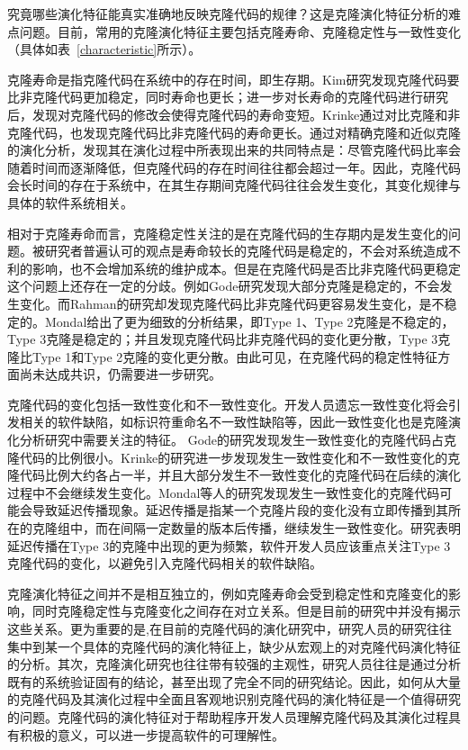 究竟哪些演化特征能真实准确地反映克隆代码的规律？这是克隆演化特征分析的难点问题。目前，常用的克隆演化特征主要包括克隆寿命、克隆稳定性与一致性变化（具体如表~\ref{characteristic}所示）。

克隆寿命是指克隆代码在系统中的存在时间，即生存期。Kim研究发现克隆代码要比非克隆代码更加稳定，同时寿命也更长\cite{kim2005empirical}；进一步对长寿命的克隆代码进行研究后，发现对克隆代码的修改会使得克隆代码的寿命变短\cite{cai2011empirical}。Krinke通过对比克隆和非克隆代码，也发现克隆代码比非克隆代码的寿命更长\cite{krinke2011cloned}。通过对精确克隆和近似克隆的演化分析，发现其在演化过程中所表现出来的共同特点是：尽管克隆代码比率会随着时间而逐渐降低，但克隆代码的存在时间往往都会超过一年\cite{bazrafshan2012evolution}。因此，克隆代码会长时间的存在于系统中，在其生存期间克隆代码往往会发生变化，其变化规律与具体的软件系统相关\cite{gode2009evolution}。

相对于克隆寿命而言，克隆稳定性关注的是在克隆代码的生存期内是发生变化的问题。被研究者普遍认可的观点是寿命较长的克隆代码是稳定的\cite{krinke2008cloned}\cite{gode2011clone}\cite{harder2013cloned}，不会对系统造成不利的影响，也不会增加系统的维护成本。但是在克隆代码是否比非克隆代码更稳定这个问题上还存在一定的分歧。例如Gode研究发现大部分克隆是稳定的，不会发生变化\cite{gode2011frequency}。而Rahman的研究却发现克隆代码比非克隆代码更容易发生变化，是不稳定的\cite{rahman2014change}。Mondal给出了更为细致的分析结果，即Type 1、Type 2克隆是不稳定的，Type 3克隆是稳定的；并且发现克隆代码比非克隆代码的变化更分散，Type 3克隆比Type 1和Type 2克隆的变化更分散\cite{mondal2012comparative}\cite{mondal2012dispersion}。由此可见，在克隆代码的稳定性特征方面尚未达成共识，仍需要进一步研究。

克隆代码的变化包括一致性变化和不一致性变化。开发人员遗忘一致性变化将会引发相关的软件缺陷，如标识符重命名不一致性缺陷等，因此一致性变化也是克隆演化分析研究中需要关注的特征。 Gode的研究发现发生一致性变化的克隆代码占克隆代码的比例很小\cite{gode2011frequency}。Krinke的研究进一步发现发生一致性变化和不一致性变化的克隆代码比例大约各占一半，并且大部分发生不一致性变化的克隆代码在后续的演化过程中不会继续发生变化\cite{krinke2007study}。Mondal等人的研究发现发生一致性变化的克隆代码可能会导致延迟传播现象。延迟传播是指某一个克隆片段的变化没有立即传播到其所在的克隆组中，而在间隔一定数量的版本后传播，继续发生一致性变化。研究表明延迟传播在Type 3的克隆中出现的更为频繁，软件开发人员应该重点关注Type 3克隆代码的变化，以避免引入克隆代码相关的软件缺陷\cite{mondal2016comparative}。

克隆演化特征之间并不是相互独立的，例如克隆寿命会受到稳定性和克隆变化的影响，同时克隆稳定性与克隆变化之间存在对立关系。但是目前的研究中并没有揭示这些关系。更为重要的是,在目前的克隆代码的演化研究中，研究人员的研究往往集中到某一个具体的克隆代码的演化特征上，缺少从宏观上的对克隆代码演化特征的分析。其次，克隆演化研究也往往带有较强的主观性，研究人员往往是通过分析既有的系统验证固有的结论，甚至出现了完全不同的研究结论。因此，如何从大量的克隆代码及其演化过程中全面且客观地识别克隆代码的演化特征是一个值得研究的问题。克隆代码的演化特征对于帮助程序开发人员理解克隆代码及其演化过程具有积极的意义，可以进一步提高软件的可理解性。

